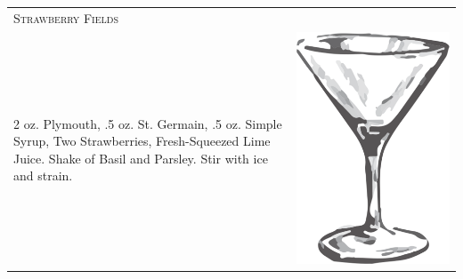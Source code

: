 \documentclass{article}
\begin{document}
\begin{tabular}{p{2in} p{0.5in}}
\multicolumn{2}{p{3in}}{\centering\Huge\textsc{Strawberry Fields}} \\ 
   \vspace{-0.1in}2 oz. Plymouth, .5 oz. St. Germain, .5 oz. Simple Syrup, Two Strawberries, Fresh-Squeezed Lime Juice. Shake of Basil and Parsley. Stir with ice and strain. &
   \vspace{-0.1in} \includegraphics{goblet.png}
\end{tabular}
\end{document}
